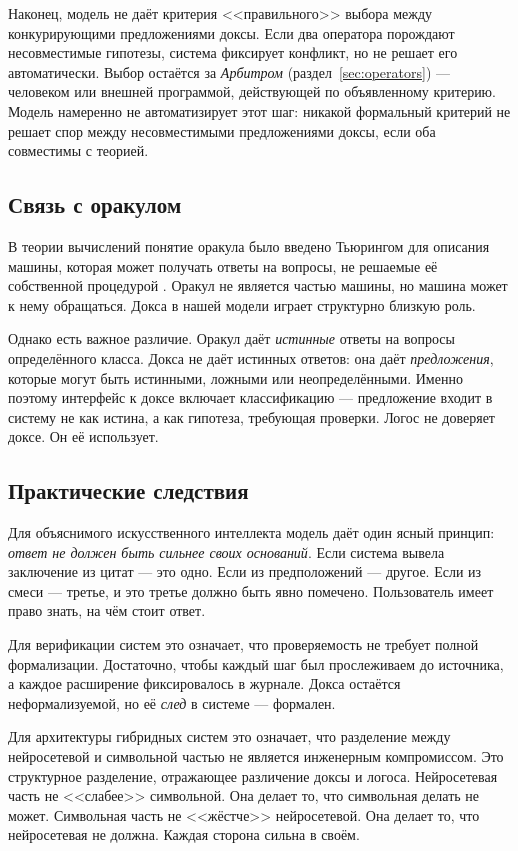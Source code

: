 \documentclass[12pt,a4paper]{article}
\begin{document}
Наконец, модель не даёт критерия <<правильного>> выбора между конкурирующими предложениями доксы.
Если два оператора порождают несовместимые гипотезы, система фиксирует конфликт, но не решает
его автоматически. Выбор остаётся за \emph{Арбитром} (раздел~\ref{sec:operators}) --- человеком или внешней
программой, действующей по объявленному критерию. Модель намеренно не автоматизирует этот шаг:
никакой формальный критерий не решает спор между несовместимыми предложениями доксы, если
оба совместимы с теорией.

\subsection{Связь с оракулом}
\label{sec:oracle}

В теории вычислений понятие оракула было введено Тьюрингом для описания машины,
которая может получать ответы на вопросы, не решаемые её собственной процедурой \cite{turing39}.
Оракул не является частью машины, но машина может к нему обращаться. Докса в нашей
модели играет структурно близкую роль.

Однако есть важное различие. Оракул даёт \emph{истинные} ответы на вопросы
определённого класса. Докса не даёт истинных ответов: она даёт \emph{предложения},
которые могут быть истинными, ложными или неопределёнными. Именно поэтому интерфейс
к доксе включает классификацию --- предложение входит в систему не как истина, а
как гипотеза, требующая проверки. Логос не доверяет доксе. Он её использует.

\subsection{Практические следствия}
\label{sec:practice}

Для объяснимого искусственного интеллекта модель даёт один ясный принцип:
\emph{ответ не должен быть сильнее своих оснований}. Если система вывела заключение
из цитат --- это одно. Если из предположений --- другое. Если из смеси --- третье,
и это третье должно быть явно помечено. Пользователь имеет право знать, на чём стоит ответ.

Для верификации систем это означает, что проверяемость не требует полной формализации.
Достаточно, чтобы каждый шаг был прослеживаем до источника, а каждое расширение фиксировалось
в журнале. Докса остаётся неформализуемой, но её \emph{след} в системе --- формален.

Для архитектуры гибридных систем это означает, что разделение между нейросетевой и символьной
частью не является инженерным компромиссом. Это структурное разделение, отражающее различение
доксы и логоса. Нейросетевая часть не <<слабее>> символьной. Она делает то, что символьная
делать не может. Символьная часть не <<жёстче>> нейросетевой. Она делает то, что нейросетевая
не должна. Каждая сторона сильна в своём.
\end{document}
